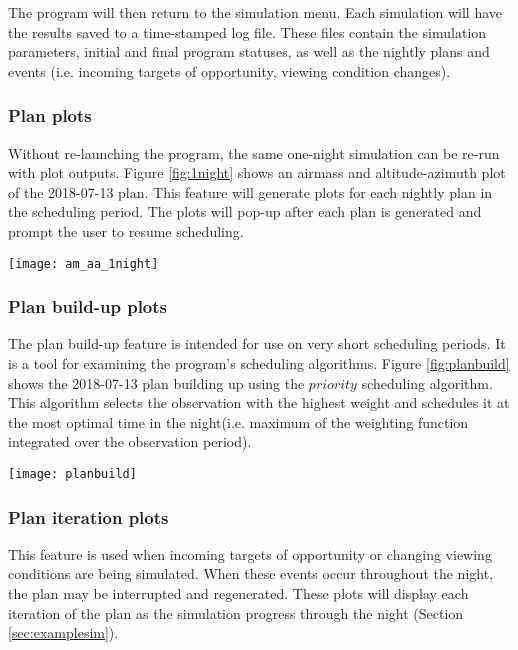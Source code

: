 \documentclass{article}
\begin{document}
The program will then return to the simulation menu.  Each simulation will have the results saved to a time-stamped log file.  These files contain the simulation parameters, initial and final program statuses, as well as the nightly plans and events (i.e. incoming targets of opportunity, viewing condition changes).\\

\subsubsection{Plan plots}

Without re-launching the program, the same one-night simulation can be re-run with plot outputs.  Figure \ref{fig:1night} shows an airmass and altitude-azimuth plot of the 2018-07-13 plan.  This feature will generate plots for each nightly plan in the scheduling period.  The plots will pop-up after each plan is generated and prompt the user to resume scheduling.

{\centering
 \texttt{[image: am\_aa\_1night]}\\
 \label{fig:1night}
}
\vspace{4mm}

\subsubsection{Plan build-up plots}
The plan build-up feature is intended for use on very short scheduling periods.  It is a tool for examining the program's scheduling algorithms.  Figure \ref{fig:planbuild} shows the 2018-07-13 plan building up using the $priority$ scheduling algorithm.  This algorithm selects the observation with the highest weight and schedules it at the most optimal time in the night(i.e. maximum of the weighting function integrated over the observation period).

{\centering
 \texttt{[image: planbuild]}\\
 \label{fig:planbuild}
}
\vspace{4mm}

\subsubsection{Plan iteration plots}
This feature is used when incoming targets of opportunity or changing viewing conditions are being simulated.  When these events occur throughout the night, the plan may be interrupted and regenerated.  These plots will display each iteration of the plan as the simulation progress through the night (Section \ref{sec:examplesim}).
\end{document}
